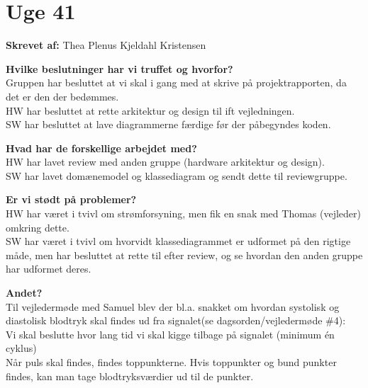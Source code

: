 \section{Uge 41}
\textbf{Skrevet af:}
Thea Plenus Kjeldahl Kristensen

\textbf{Hvilke beslutninger har vi truffet og hvorfor? } \\
Gruppen har besluttet at vi skal i gang med at skrive på projektrapporten, da det er den der bedømmes. \\
HW har besluttet at rette arkitektur og design til ift vejledningen. \\
SW har besluttet at lave diagrammerne færdige før der påbegyndes koden. 

\textbf{Hvad har de forskellige arbejdet med? } \\
HW har lavet review med anden gruppe (hardware arkitektur og design). \\
SW har lavet domænemodel og klassediagram og sendt dette til reviewgruppe. 

\textbf{Er vi stødt på problemer? } \\
HW har været i tvivl om strømforsyning, men fik en snak med Thomas (vejleder) omkring dette. \\
SW har været i tvivl om hvorvidt klassediagrammet er udformet på den rigtige måde, men har besluttet at rette til efter review, og se hvordan den anden gruppe har udformet deres. 

\textbf{Andet?} \\
Til vejledermøde med Samuel blev der bl.a. snakket om hvordan systolisk og diastolisk blodtryk skal findes ud fra signalet(se dagsorden/vejledermøde \#4): \\
Vi skal beslutte hvor lang tid vi skal kigge tilbage på signalet (minimum én cyklus) \\
Når puls skal findes, findes toppunkterne. Hvis toppunkter og bund punkter findes, kan man tage blodtryksværdier ud til de punkter. 

\clearpage